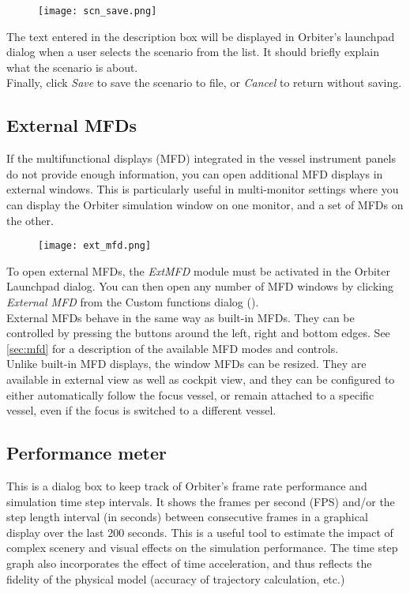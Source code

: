 \documentclass[Orbiter User Manual.tex]{subfiles}
\begin{document}
\begin{figure}[H]
	\centering
	\texttt{[image: scn\_save.png]}
\end{figure}

\noindent
The text entered in the description box will be displayed in Orbiter's launchpad dialog when a user selects the scenario from the list. It should briefly explain what the scenario is about.\\
Finally, click \textit{Save} to save the scenario to file, or \textit{Cancel} to return without saving.


\subsection{External MFDs}
If the multifunctional displays (MFD) integrated in the vessel instrument panels do not provide enough information, you can open additional MFD displays in external windows. This is particularly useful in multi-monitor settings where you can display the Orbiter simulation window on one monitor, and a set of MFDs on the other.

\begin{figure}[H]
	\centering
	\texttt{[image: ext\_mfd.png]}
\end{figure}

\noindent
To open external MFDs, the \textit{ExtMFD} module must be activated in the Orbiter Launchpad dialog. You can then open any number of MFD windows by clicking \textit{External MFD} from the Custom functions dialog (\Ctrl{}).\\
External MFDs behave in the same way as built-in MFDs. They can be controlled by pressing the buttons around the left, right and bottom edges. See \ref{sec:mfd} for a description of the available MFD modes and controls.\\
Unlike built-in MFD displays, the window MFDs can be resized. They are available in external view as well as cockpit view, and they can be configured to either automatically follow the focus vessel, or remain attached to a specific vessel, even if the focus is switched to a different vessel.


\subsection{Performance meter}
This is a dialog box to keep track of Orbiter's frame rate performance and simulation time step intervals. It shows the frames per second (FPS) and/or the step length interval (in seconds) between consecutive frames in a graphical display over the last 200 seconds. This is a useful tool to estimate the impact of complex scenery and visual effects on the simulation performance. The time step graph also incorporates the effect of time acceleration, and thus reflects the fidelity of the physical model (accuracy of trajectory calculation, etc.)
\end{document}
